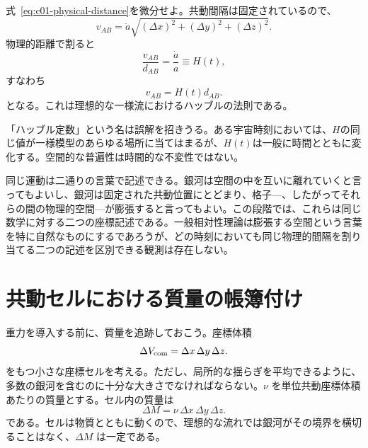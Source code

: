 式~\eqref{eq:c01-physical-distance}を微分せよ。共動間隔は固定されているので、
\begin{equation}
v_{AB}=\dot a\sqrt{(\Delta x)^2+(\Delta y)^2+(\Delta z)^2}.
\end{equation}
物理的距離で割ると
\begin{equation}
\frac{v_{AB}}{d_{AB}}=\frac{\dot a}{a}\equiv H(t),
\label{eq:c01-hubble-parameter}
\end{equation}
すなわち
\begin{equation}
\boxed{v_{AB}=H(t)d_{AB}.}
\label{eq:c01-hubble-law}
\end{equation}
となる。これは理想的な一様流におけるハッブルの法則である。

「ハッブル定数」という名は誤解を招きうる。ある宇宙時刻においては、\(H\)の同じ値が一様模型のあらゆる場所に当てはまるが、\(H(t)\)は一般に時間とともに変化する。空間的な普遍性は時間的な不変性ではない。

\begin{classroomqa}
\end{classroomqa}

同じ運動は二通りの言葉で記述できる。銀河は空間の中を互いに離れていくと言ってもよいし、銀河は固定された共動位置にとどまり、格子---、したがってそれらの間の物理的空間---が膨張すると言ってもよい。この段階では、これらは同じ数学に対する二つの座標記述である。一般相対性理論は膨張する空間という言葉を特に自然なものにするであろうが、どの時刻においても同じ物理的間隔を割り当てる二つの記述を区別できる観測は存在しない。

\section{共動セルにおける質量の帳簿付け}

重力を導入する前に、質量を追跡しておこう。座標体積
\begin{equation}
\Delta V_{\rm com}=\Delta x\,\Delta y\,\Delta z.
\end{equation}
をもつ小さな座標セルを考える。ただし、局所的な揺らぎを平均できるように、多数の銀河を含むのに十分な大きさでなければならない。\(\nu\) を単位共動座標体積あたりの質量とする。セル内の質量は
\begin{equation}
\Delta M=\nu\,\Delta x\,\Delta y\,\Delta z.
\label{eq:c01-comoving-mass}
\end{equation}
である。セルは物質とともに動くので、理想的な流れでは銀河がその境界を横切ることはなく、\(\Delta M\) は一定である。

